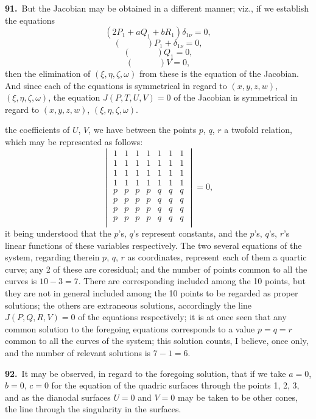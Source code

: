 \documentclass[11pt,a4paper]{article}
\begin{document}
\medskip

\textbf{91.}\ But the Jacobian may be obtained in a different manner; viz., if we establish the equations
\[
(2P_1 + a Q_1 + b R_1)\delta_{1\nu} = 0,
\]
\[
( \quad \quad \quad ) P_1 + \delta_{1\nu} = 0,
\]
\[
( \quad \quad \quad ) Q_1 = 0,
\]
\[
( \quad \quad \quad ) V = 0,
\]
then the elimination of $(\xi, \eta, \zeta, \omega)$ from these is the equation of the Jacobian. And since each of the equations is symmetrical in regard to $(x, y, z, w)$, $(\xi, \eta, \zeta, \omega)$, the equation $J(P, T, U, V) = 0$ of the Jacobian is symmetrical in regard to $(x, y, z, w)$, $(\xi, \eta, \zeta, \omega)$.

\newpage
\setcounter{page}{170}

\noindent the coefficients of $U$, $V$, we have between the points $p$, $q$, $r$ a twofold relation, which may be represented as follows:
\[
\begin{vmatrix}
1 & 1 & 1 & 1 & 1 & 1 & 1\\
1 & 1 & 1 & 1 & 1 & 1 & 1\\
1 & 1 & 1 & 1 & 1 & 1 & 1\\
1 & 1 & 1 & 1 & 1 & 1 & 1\\
p & p & p & p & q & q & q\\
p & p & p & p & q & q & q\\
p & p & p & p & q & q & q\\
p & p & p & p & q & q & q\\
\end{vmatrix} = 0,
\]
it being understood that the $p$'s, $q$'s represent constants, and the $p$'s, $q$'s, $r$'s linear functions of these variables respectively. The two several equations of the system, regarding therein $p$, $q$, $r$ as coordinates, represent each of them a quartic curve; any 2 of these are coresidual; and the number of points common to all the curves is $10 - 3 = 7$. There are corresponding included among the 10 points, but they are not in general included among the 10 points to be regarded as proper solutions; the others are extraneous solutions, accordingly the line $J(P, Q, R, V) = 0$ of the equations respectively; it is at once seen that any common solution to the foregoing equations corresponds to a value $p = q = r$ common to all the curves of the system; this solution counts, I believe, once only, and the number of relevant solutions is $7 - 1 = 6$.

\medskip

\textbf{92.}\ It may be observed, in regard to the foregoing solution, that if we take $a = 0$, $b = 0$, $c = 0$ for the equation of the quadric surfaces through the points 1, 2, 3, and as the dianodal surfaces $U = 0$ and $V = 0$ may be taken to be other cones, the line through the singularity in the surfaces.
\end{document}
